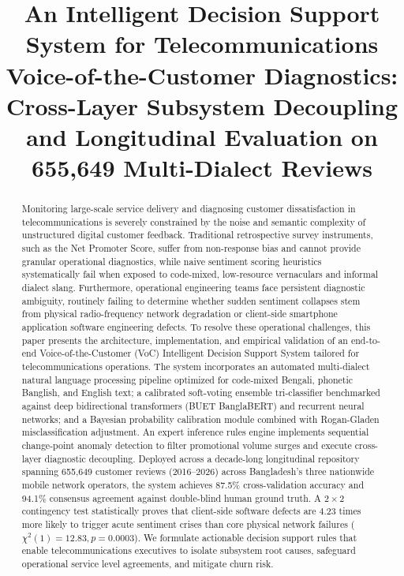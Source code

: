 \documentclass[review,12pt,authoryear]{elsarticle}
\begin{document}
\begin{frontmatter}

\title{An Intelligent Decision Support System for Telecommunications Voice-of-the-Customer Diagnostics: Cross-Layer Subsystem Decoupling and Longitudinal Evaluation on 655,649 Multi-Dialect Reviews}

\begin{abstract}
Monitoring large-scale service delivery and diagnosing customer dissatisfaction in telecommunications is severely constrained by the noise and semantic complexity of unstructured digital customer feedback. Traditional retrospective survey instruments, such as the Net Promoter Score, suffer from non-response bias and cannot provide granular operational diagnostics, while naive sentiment scoring heuristics systematically fail when exposed to code-mixed, low-resource vernaculars and informal dialect slang. Furthermore, operational engineering teams face persistent diagnostic ambiguity, routinely failing to determine whether sudden sentiment collapses stem from physical radio-frequency network degradation or client-side smartphone application software engineering defects. To resolve these operational challenges, this paper presents the architecture, implementation, and empirical validation of an end-to-end Voice-of-the-Customer (VoC) Intelligent Decision Support System tailored for telecommunications operations. The system incorporates an automated multi-dialect natural language processing pipeline optimized for code-mixed Bengali, phonetic Banglish, and English text; a calibrated soft-voting ensemble tri-classifier benchmarked against deep bidirectional transformers (BUET BanglaBERT) and recurrent neural networks; and a Bayesian probability calibration module combined with Rogan-Gladen misclassification adjustment. An expert inference rules engine implements sequential change-point anomaly detection to filter promotional volume surges and execute cross-layer diagnostic decoupling. Deployed across a decade-long longitudinal repository spanning 655,649 customer reviews (2016--2026) across Bangladesh's three nationwide mobile network operators, the system achieves 87.5\% cross-validation accuracy and 94.1\% consensus agreement against double-blind human ground truth. A $2 \times 2$ contingency test statistically proves that client-side software defects are 4.23 times more likely to trigger acute sentiment crises than core physical network failures ($\chi^2(1) = 12.83, p = 0.0003$). We formulate actionable decision support rules that enable telecommunications executives to isolate subsystem root causes, safeguard operational service level agreements, and mitigate churn risk.
\end{abstract}


\end{frontmatter}
\end{document}
